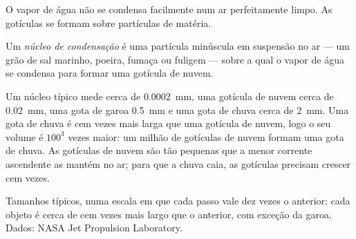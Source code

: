 O vapor de água não se condensa facilmente num ar perfeitamente limpo. As
gotículas se formam sobre partículas de matéria.

\begin{definition}\label{def:g10:why-clouds-form:nucleus}
Um \emph{núcleo de condensação}
é uma partícula minúscula em suspensão no ar --- um grão de sal marinho,
poeira, fumaça ou fuligem --- sobre a qual o vapor de água se condensa para
formar uma gotícula de nuvem.
\end{definition}

Um núcleo típico mede cerca de \qty{0.0002}{mm}, uma gotícula de nuvem
cerca de \qty{0.02}{mm}, uma gota de garoa \qty{0.5}{mm} e uma gota de chuva
cerca de \qty{2}{mm}. Uma gota de chuva é cem vezes mais larga que uma
gotícula de nuvem, logo o seu volume é $100^3$ vezes maior: um milhão de
gotículas de nuvem formam uma gota de chuva. As gotículas de nuvem são tão
pequenas que a menor corrente ascendente as mantém no ar; para que a chuva
caia, as gotículas precisam crescer cem vezes.

\begin{omfigure}

{\small Tamanhos típicos, numa escala em que cada passo vale dez vezes o
anterior: cada objeto é cerca de cem vezes mais largo que o anterior, com
exceção da garoa. Dados: NASA Jet Propulsion Laboratory.}
\end{omfigure}

